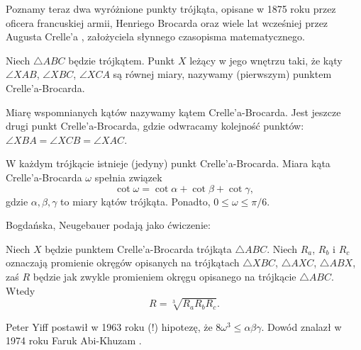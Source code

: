 
Poznamy teraz dwa wyróżnione punkty trójkąta, opisane w 1875 roku przez oficera francuskiej armii, Henriego Brocarda oraz wiele lat wcześniej przez Augusta Crelle'a \cite{crelle_1816}, założyciela słynnego czasopisma matematycznego.
%
%

\begin{definition}
    Niech $\triangle ABC$ będzie trójkątem.
    Punkt $X$ leżący w jego wnętrzu taki, że kąty $\angle XAB$, $\angle XBC$, $\angle XCA$ są równej miary, nazywamy (pierwszym) punktem Crelle'a-Brocarda.
\end{definition}

%
%

Miarę wspomnianych kątów nazywamy kątem Crelle'a-Brocarda.
Jest jeszcze drugi punkt Crelle'a-Brocarda, gdzie odwracamy kolejność punktów: $\angle XBA = \angle XCB = \angle XAC$.

\begin{proposition}
    W każdym trójkącie istnieje (jedyny) punkt Crelle'a-Brocarda.
    Miara kąta Crelle'a-Brocarda $\omega$ spełnia związek
    \begin{equation}
        \cot \omega = \cot \alpha + \cot \beta + \cot \gamma,
    \end{equation}
    gdzie $\alpha, \beta, \gamma$ to miary kątów trójkąta.
    Ponadto, $0 \le \omega \le \pi/6$.
\end{proposition}

Bogdańska, Neugebauer \cite[s. 100]{neugebauer_2018} podają jako ćwiczenie:

\begin{proposition}
    Niech $X$ będzie punktem Crelle'a-Brocarda trójkąta $\triangle ABC$.
    Niech $R_a$, $R_b$ i $R_c$ oznaczają promienie okręgów opisanych na trójkątach $\triangle XBC$, $\triangle AXC$, $\triangle ABX$, zaś $R$ będzie jak zwykle promieniem okręgu opisanego na trójkącie $\triangle ABC$.
    Wtedy
    \begin{equation}
        R = \sqrt[3]{R_a R_b R_c}.
    \end{equation}
\end{proposition}

Peter Yiff \cite{yff_1963} postawił w 1963 roku (!) hipotezę, że $8 \omega^3 \le \alpha \beta \gamma$.
%
Dowód znalazł w 1974 roku Faruk Abi-Khuzam \cite{abikhuzam_1974}.
%


